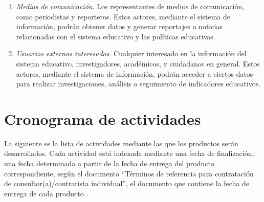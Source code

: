 \documentclass[a4paper, 9pt, conference]{article}              %
\theoremstyle{definition}
\begin{document}
\begin{enumerate}
	\item \emph{Medios de comunicaci\'on}. Los representantes de medios de comunicaci\'on, como periodistas y reporteros. Estos actores, mediante el sistema de informaci\'on, podr\'an obtener datos y generar reportajes o noticias relacionadas con el sistema educativo y las pol\'iticas educativas.

	\item \emph{Usuarios externos interesados}. Cualquier interesado en la informaci\'on del sistema educativo, investigadores, acad\'emicos, y ciudadanos en general. Estos actores, mediante el sistema de informaci\'on, podr\'an acceder a ciertos datos para realizar investigaciones, an\'alisis o seguimiento de indicadores educativos.
\end{enumerate}

\section{Cronograma de actividades} \label{sec:crono}

La siguiente es la lista de actividades mediante las que los productos ser\'an desarrollados. Cada actividad est\'a indexada mediante una fecha de finalizaci\'on, una fecha determinada a partir de la fecha de entrega del producto correspondiente, seg\'un el documento ``T\'erminos de referencia para contrataci\'on de consultor(a)/contratista individual'', el documento que contiene la fecha de entrega de cada producto \cite{trd}.
\end{document}
